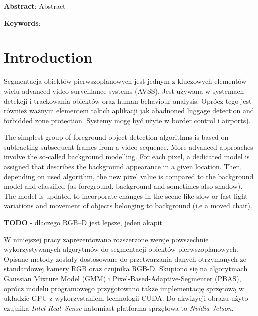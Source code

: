 \documentclass[b5paper,10pt,twoside]{article}
\begin{document}
\noindent
{\small \textbf{Abstract}: Abstract
\vspace{12pt}

\noindent
{\small \textbf{Keywords}: }


\section{Introduction}
\label{sec:introduction}

Segmentacja obiektów pierwszoplanowych jest jednym z kluczowych elementów wielu advanced video surveillance systems (AVSS). Jest używana w systemach detekcji i trackowania obiektów oraz human behaviour analysis. Oprócz tego jest również ważnym elementem takich aplikacji jak abadnoned luggage detection and forbidded zone protection. Systemy mogę być użyte w border control i airports).

The simplest group of foreground object detection algorithms
is based on subtracting subsequent frames from a video
sequence. More advanced approaches involve the so-called
background modelling. For each pixel, a dedicated model is
assigned that describes the background appearance in a given
location. Then, depending on used algorithm, the new pixel
value is compared to the background model and classified
(as foreground, background and sometimes also shadow). The
model is updated to incorporate changes in the scene like slow
or fast light variations and movement of objects belonging to
background (i.e a moved chair).

\textbf{TODO} - dlaczego RGB--D jest lepsze, jeden akapit

W niniejszej pracy zaprezentowano rozszerzone wersje powszechnie wykorzystywanych algorytmów do segmentacji obiektów pierwszoplanowych. Opisane metody zostały dostosowane do przetwarzania danych otrzymanych ze standardowej kamery RGB oraz czujnika RGB-D. Skupiono się na algorytmach Gaussian Mixture Model (GMM) i Pixel-Based-Adaptive-Segmenter (PBAS), oprócz modelu programowego przygotowano także implementację sprzętową w układzie GPU z wykorzystaniem technologii CUDA. Do akwizycji obrazu użyto czujnika \textit{Intel Real--Sense} natomiast platforma sprzętowa to \textit{Nvidia Jetson}.

}
\end{document}
